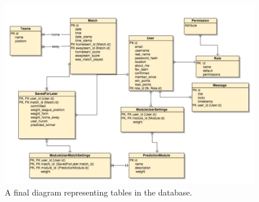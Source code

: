 \begin{figure}[H]
	\begin{center}
		\includegraphics[width=.90\textwidth]{design/images/database_export.jpg}
		\caption{A final diagram representing tables in the database.}
		\label{fig:using:databaseschema}
	\end{center}
\end{figure}